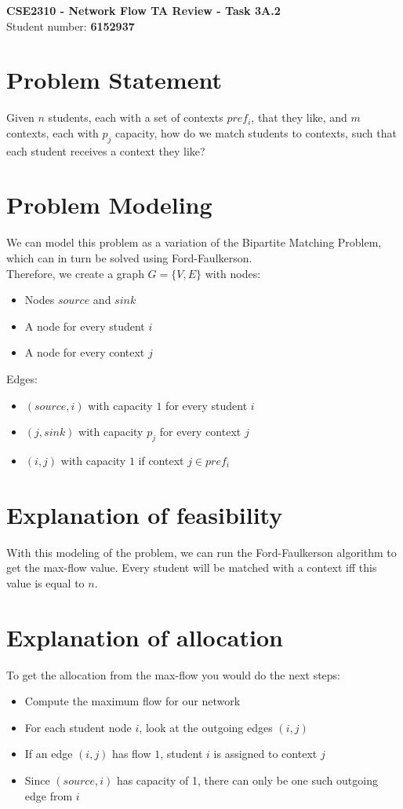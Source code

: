 \documentclass[a4paper,11pt]{article}
\begin{document}
	\begin{center}
		{\Large \textbf{CSE2310 - Network Flow TA Review - Task 3A.2}}\\[4pt]
		Student number: \textbf{6152937}
	\end{center}

	\vspace{1em}

	\section*{Problem Statement}
	Given $n$ students, each with a set of contexts $pref_i$, that they like, and $m$ contexts, each with $p_j$ capacity, how do we match students to contexts, such that each student receives a context they like?

	\section{Problem Modeling}
	We can model this problem as a variation of the Bipartite Matching Problem, which can in turn be solved using Ford-Faulkerson.\\
	Therefore, we create a graph $G=\{V,E\}$ with nodes:
	\begin{itemize}
		\item Nodes $source$ and $sink$
		\item A node for every student $i$
		\item A node for every context $j$
	\end{itemize}
	Edges:
	\begin{itemize}
		\item $(source, i)$ with capacity $1$ for every student $i$
		\item $(j, sink)$ with capacity $p_j$ for every context $j$
		\item $(i,j)$ with capacity $1$ if context $j\in pref_i$
	\end{itemize}


	\section{Explanation of feasibility}
	With this modeling of the problem, we can run the Ford-Faulkerson algorithm to get the max-flow value. Every student will be matched with a context iff this value is equal to $n$.

	\section{Explanation of allocation}
	To get the allocation from the max-flow you would do the next steps:
	\begin{itemize}
		\item Compute the maximum flow for our network
		\item For each student node $i$, look at the outgoing edges $(i,j)$
		\item If an edge $(i,j)$ has flow $1$, student $i$ is assigned to context $j$
		\item Since $(source, i)$ has capacity of 1, there can only be one such outgoing edge from $i$
	\end{itemize}
\end{document}
